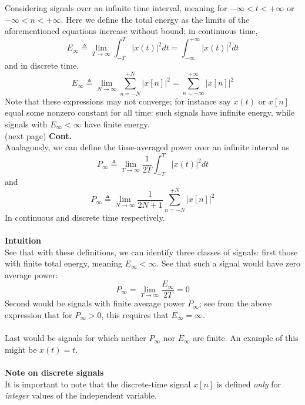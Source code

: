 \documentclass{report}
\begin{document}
Considering signals over an infinite time interval, meaning for $-\infty<t<+\infty$ or $-\infty<n<+\infty$. 
Here we define the total energy as the limits of the aforementioned equations increase without bound; in continuous
time,
\begin{equation*}
E_\infty\triangleq\lim_{T\to\infty}\int^T_{-T}|x(t)|^2dt
=\int^{+\infty}_{-\infty}|x(t)|^2dt
\end{equation*}
and in discrete time,
\begin{equation*}
E_\infty\triangleq\lim_{N\to\infty}\sum^{+N}_{n=-N}|x[n]|^2=\sum^{+\infty}_{n=-\infty}|x[n]|^2
\end{equation*}
Note that these expressions may not converge; for instance say $x(t)$ or $x[n]$ equal some nonzero constant for 
all time: such signals have infinite energy, while signals with $E_\infty<\infty$ have finite energy.\\
(next page)\newpage
\noindent\textbf{Cont.}\\
Analagously, we can define the time-averaged power over an infinite interval as
\begin{equation*}
P_\infty\triangleq\lim_{T\to\infty}\frac{1}{2T}\int^T_{-T}|x(t)|^2dt
\end{equation*}
and
\begin{equation*}
P_\infty\triangleq\lim_{N\to\infty}\frac{1}{2N+1}\sum^{+N}_{n=-N}|x[n]|^2
\end{equation*}
In continuous and discrete time respectively. \\
\vspace{1mm}\\
\textbf{Intuition}\\
See that with these definitions, we can identify three classes of signals: first those with finite total energy,
meaning $E_\infty<\infty$. See that such a signal would have zero average power:
\begin{equation*}
P_\infty=\lim_{T\to\infty}\frac{E_\infty}{2T}=0
\end{equation*}
Second would be signals with finite average power $P_\infty$; see from the above expression that for $P_\infty>0$,
this requires that $E_\infty=\infty$.\\
\vspace{1mm}\\
Last would be signals for which neither $P_\infty$ nor $E_\infty$ are finite. An example of this might be $x(t)=t$.\\
\vspace{1mm}\\
\textbf{Note on discrete signals}\\
It is important to note that the discrete-time signal $x[n]$ is defined \textit{only} for \textit{integer} 
values of the independent variable.
\newpage
\end{document}
